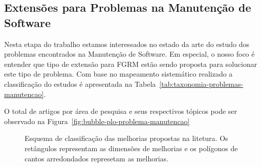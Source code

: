 \subsection{Extensões para Problemas na Manutenção de Software}
\label{sub:extensões_para_problemas_na_manutenção_de_software}

Nesta etapa do trabalho estamos interessados no estado da arte do estudo dos
problemas encontrados na Manutenção de Software. Em especial, o nosso foco é
entender que tipo de extensão para FGRM estão sendo proposta para solucionar
este tipo de problema. Com base no mapeamento sistemático realizado a
classificação do estudos é apresentada na
Tabela~\ref{tab:taxonomia-problemas-manutencao}.

O total de artigos por área de pesquisa e seus respectivos tópicos pode ser
observado na Figura~\ref{fig:bubble-plo-problema-manutencao}




\begin{figure}[tb]
\centering
\caption{Esquema de classificação das melhorias propostas na litetura. Os
	retângulos representam as dimensões de melhorias e os polígonos de cantos
	arredondados represetam as melhorias.}
\label{fig:diagrama-esquema-dimensao-melhorias}
\end{figure}

